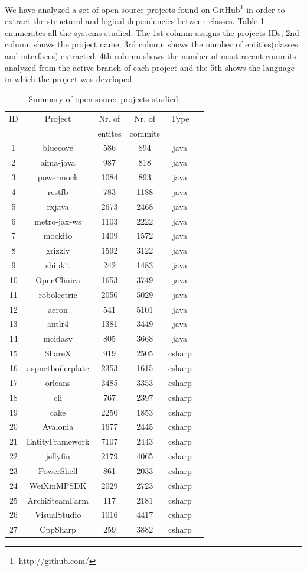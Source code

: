 \documentclass[12pt]{mitthesis}
\begin{document}
We have analyzed a set of open-source projects found on GitHub\footnote{http://github.com/} \cite{Kalliamvakou2016} in order to extract the structural and logical dependencies between classes. Table \ref{table:1} enumerates all the systems studied. The 1st column assigns the projects IDs; 2nd column shows the project name; 3rd column shows the number of entities(classes and interfaces) extracted; 4th column shows the number of most recent commits analyzed from the active branch of each project and the 5th shows the language in which the project was developed.
\begin{table}[H]
\caption{Summary of open source projects studied.}
\label{table:1}
\centering
\begin{tabular}{|c|c|c|c|c|c|}
\hline
   ID  & Project    & Nr. of & Nr. of& Type\\
     &     & entites & commits & \\
\hline
1	&	bluecove	&	586	&	894	&	java	\\
2	&	aima-java	&	987	&	818	&	java	\\
3	&	powermock	&	1084	&	893	&	java	\\
4	&	restfb	&	783	&	1188	&	java	\\
5	&	rxjava	&	2673	&	2468	&	java	\\
6	&	metro-jax-ws	&	1103	&	2222	&	java	\\
7	&	mockito	&	1409	&	1572	&	java	\\
8	&	grizzly	&	1592	&	3122	&	java	\\
9	&	shipkit	&	242	&	1483	&	java	\\
10	&	OpenClinica	&	1653	&	3749	&	java	\\
11	&	robolectric	&	2050	&	5029	&	java	\\
12	&	aeron	&	541	&	5101	&	java	\\
13	&	antlr4	&	1381	&	3449	&	java	\\
14	&	mcidasv	&	805	&	3668	&	java	\\
15	&	ShareX	&	919	&	2505	&	csharp	\\
16	&	aspnetboilerplate	&	2353	&	1615	&	csharp	\\
17	&	orleans	&	3485	&	3353	&	csharp	\\
18	&	cli	&	767	&	2397	&	csharp	\\
19	&	cake	&	2250	&	1853	&	csharp	\\
20	&	Avalonia	&	1677	&	2445	&	csharp	\\
21	&	EntityFramework	&	7107	&	2443	&	csharp	\\
22	&	jellyfin	&	2179	&	4065	&	csharp	\\
23	&	PowerShell	&	861	&	2033	&	csharp	\\
24	&	WeiXinMPSDK	&	2029	&	2723	&	csharp	\\
25	&	ArchiSteamFarm	&	117	&	2181	&	csharp	\\
26	&	VisualStudio	&	1016	&	4417	&	csharp	\\
27	&	CppSharp	&	259	&	3882	&	csharp	\\
\hline
\end{tabular}
\end{table}
\end{document}
